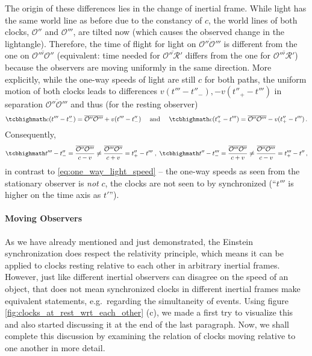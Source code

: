 The origin of these differences lies in the change of inertial frame. While light has the same world line as before due to the constancy of $c$, the world lines of both clocks, $\mathcal{O}''$ and $\mathcal{O}'''$, are tilted now (which causes the observed change in the lightangle). Therefore, the time of flight for light on $\overline{\mathcal{O}'' \mathcal{O}'''}$ is different from the one on $\overline{\mathcal{O}''' \mathcal{O}''}$ (equivalent: time needed for $\overline{\mathcal{O}'' \mathcal{R}'}$ differs from the one for $\overline{\mathcal{O}''' \mathcal{R}'}$) because the observers are moving uniformly in the same direction. More explicitly, while the one-way speeds of light are still $c$ for both paths, the uniform motion of both clocks leads to differences $v (t''' - t''_-), -v (t''_+ - t''')$ in separation $\overline{\mathcal{O}'' \mathcal{O}'''}$ and thus (for the resting observer)
\begin{equation}\label{eq:one_way_light_speed_v2}
	\eqbox{
	c (t''' - t''_-) = \overline{\mathcal{O}'' \mathcal{O}'''} + v (t''' - t''_-)
	}
	\quad \text{ and } \quad
	\eqbox{
	c (t''_+ - t''') = \overline{\mathcal{O}'' \mathcal{O}'''} - v (t''_+ - t''')
	} \, .
\end{equation}
Consequently,
\begin{align}
	\eqbox{
	t''' - t''_- = \frac{\overline{\mathcal{O}'' \mathcal{O}'''}}{c - v} \neq \frac{\overline{\mathcal{O}''' \mathcal{O}''}}{c + v} = t''_+ - t'''
	}
	\; , \;
	\eqbox{
	t'' - t'''_- = \frac{\overline{\mathcal{O}''' \mathcal{O}''}}{c + v} \neq \frac{\overline{\mathcal{O}'' \mathcal{O}'''}}{c - v} = t'''_+ - t''
	} \, ,
\end{align}
in contrast to  \eqref{eq:one_way_light_speed} -- the one-way speeds as seen from the stationary observer is \emph{not} $c$, the clocks are not seen to by synchronized (\enquote{$t'''$ is higher on the time axis as $t'$}).



			\paragraph{Moving Observers}
As we have already mentioned and just demonstrated, the Einstein synchronization does respect the relativity principle, which means it can be applied to clocks resting relative to each other in arbitrary inertial frames. However, just like different inertial observers can disagree on the speed of an object, that does not mean synchronized clocks in different inertial frames make equivalent statements, e.g.~regarding the simultaneity of events. Using figure \ref{fig:clocks_at_rest_wrt_each_other} (c), we made a first try to visualize this and also started discussing it at the end of the last paragraph. Now, we shall complete this discussion by examining the relation of clocks moving relative to one another in more detail.


